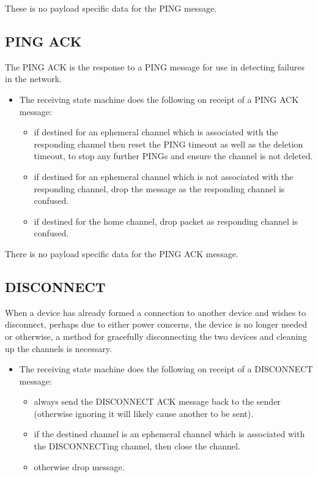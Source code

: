 These is no payload specific data for the PING message.

\subsection{PING ACK} %
\label{sub:ping_ack}
The PING ACK is the response to a PING message for use in detecting failures in the network.
\vspace{-5mm} 
\begin{itemize}
	\item []The receiving state machine does the following on receipt of a PING ACK message:
	\begin{itemize}
		\item if destined for an ephemeral channel which is associated with the responding channel then reset the PING timeout as well as the deletion timeout, to stop any further PINGs and ensure the channel is not deleted. 
		\item if destined for an ephemeral channel which is not associated with the responding channel, drop the message as the responding channel is confused.
		\item if destined for the home channel, drop packet as responding channel is confused.
	\end{itemize}
\end{itemize}

There is no payload specific data for the PING ACK message.

\subsection{DISCONNECT} %
\label{sub:disconnect}
When a device has already formed a connection to another device and wishes to disconnect, perhaps due to either power concerns, the device is no longer needed or otherwise, a method for gracefully disconnecting the two devices and cleaning up the channels is necessary.
\vspace{-5mm} 
 \begin{itemize}
	\item []The receiving state machine does the following on receipt of a DISCONNECT message:
	\begin{itemize}
		\item always send the DISCONNECT ACK message back to the sender (otherwise ignoring it will likely cause another to be sent).
		\item if the destined channel is an ephemeral channel which is associated with the DISCONNECTing channel, then close the channel.
		\item otherwise drop message. 
	\end{itemize}
\end{itemize}

